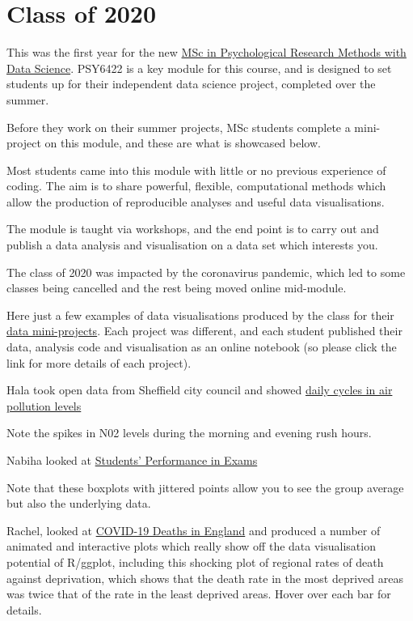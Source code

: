 \documentclass[
]{book}
\begin{document}
\hypertarget{class-of-2020}{%
\chapter{Class of 2020}\label{class-of-2020}}

This was the first year for the new \href{https://www.sheffield.ac.uk/psychology/prospectivepg/masters/data-science}{MSc in Psychological Research Methods with Data Science}. PSY6422 is a key module for this course, and is designed to set students up for their independent data science project, completed over the summer.

Before they work on their summer projects, MSc students complete a mini-project on this module, and these are what is showcased below.

Most students came into this module with little or no previous experience of coding. The aim is to share powerful, flexible, computational methods which allow the production of reproducible analyses and useful data visualisations.

The module is taught via workshops, and the end point is to carry out and publish a data analysis and visualisation on a data set which interests you.

The class of 2020 was impacted by the coronavirus pandemic, which led to some classes being cancelled and the rest being moved online mid-module.

Here just a few examples of data visualisations produced by the class for their \href{docs/final-project.html}{data mini-projects}. Each project was different, and each student published their data, analysis code and visualisation as an online notebook (so please click the link for more details of each project).

Hala took open data from Sheffield city council and showed \href{https://halaaj.github.io/PSY6422/}{daily cycles in air pollution levels}

Note the spikes in N02 levels during the morning and evening rush hours.

Nabiha looked at \href{https://nabihaahmad.github.io/}{Students' Performance in Exams}

Note that these boxplots with jittered points allow you to see the group average but also the underlying data.

Rachel, looked at \href{https://rachelanthony.github.io/}{COVID-19 Deaths in England} and produced a number of animated and interactive plots which really show off the data visualisation potential of R/ggplot, including this shocking plot of regional rates of death against deprivation, which shows that the death rate in the most deprived areas was twice that of the rate in the least deprived areas. Hover over each bar for details.
\end{document}
